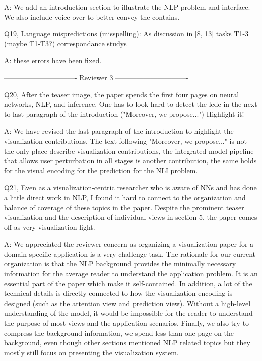 A: We add an introduction section to illustrate the NLP problem and interface. We also include voice over to better convey the contains.

Q19, Language mispredictions (misspelling):
As discussion in [8, 13]
tasks T1-3 (maybe T1-T3?)
correspondance
studys

A: these errors have been fixed.

------------------------------- Reviewer 3 -------------------------------

Q20, After the teaser image, the paper spends the first four pages on neural networks, NLP, and inference. One has to look hard to detect the lede in the next to last paragraph of the introduction ("Moreover, we propose...") Highlight it!

A: We have revised the last paragraph of the introduction to highlight the visualization contributions. The text following "Moreover, we propose..." is not the only place describe visualization contributions, the integrated model pipeline that allows user perturbation in all stages is another contribution, the same holds for the visual encoding for the prediction for the NLI problem.

Q21, Even as a visualization-centric researcher who is aware of NNs and has done a little direct work in NLP, I found it hard to connect to the organization and balance of coverage of these topics in the paper. Despite the prominent teaser visualization and the description of individual views in section 5, the paper comes off as very visualization-light.

A: We appreciated the reviewer concern as organizing a visualization paper for a domain specific application is a very challenge task. The rationale for our current organization is that the NLP background provides the minimally necessary information for the average reader to understand the application problem. It is an essential part of the paper which make it self-contained. In addition, a lot of the technical details is directly connected to how the visualization encoding is designed (such as the attention view and prediction view). Without a high-level understanding of the model, it would be impossible for the reader to understand the purpose of most views and the application scenarios. Finally, we also try to compress the background information, we spend less than one page on the background, even though other sections mentioned NLP related topics but they mostly still focus on presenting the visualization system.


